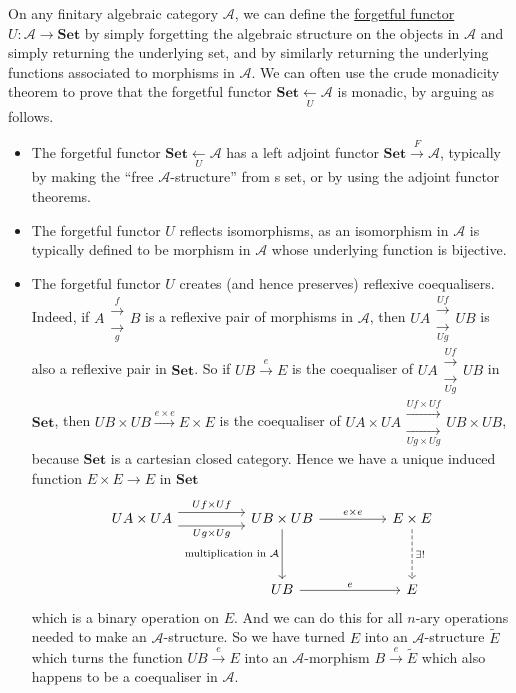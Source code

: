 \documentclass[a4paper,11pt]{article}
\theoremstyle{break_italics}
\theoremstyle{break_upright}
\theoremstyle{remark}
\newcommand{\Set}{\mathbf{Set}}
\begin{document}
On any finitary algebraic category $\mathcal A$, we can define the \uline{forgetful functor} $U \colon \mathcal A \to \Set$ by simply forgetting the algebraic structure on the objects in $\mathcal A$ and simply returning the underlying set, and by similarly returning the underlying functions associated to morphisms in $\mathcal A$. We can often use the crude monadicity theorem to prove that the forgetful functor $\Set \xleftarrow[U]{} \mathcal A$ is monadic, by arguing as follows.
\begin{itemize}
	\item The forgetful functor $\Set \xleftarrow[U]{} \mathcal A$ has a left adjoint functor $\Set \xrightarrow{F} \mathcal A$, typically by making the ``free $\mathcal A$-structure'' from s set, or by using the adjoint functor theorems.
	\item The forgetful functor $U$ reflects isomorphisms, as an isomorphism in $\mathcal A$ is typically defined to be morphism in $\mathcal A$ whose underlying function is bijective.
	\item The forgetful functor $U$ creates (and hence preserves) reflexive coequalisers. Indeed, if $A \substack{\xrightarrow{f} \\ \xrightarrow[g]{}} B$ is a reflexive pair of morphisms in $\mathcal A$, then $UA \substack{\xrightarrow{Uf} \\ \xrightarrow[Ug]{}} UB$ is also a reflexive pair in $\Set$. So if $UB \xrightarrow{e} E$ is the coequaliser of $UA \substack{\xrightarrow{Uf} \\ \xrightarrow[Ug]{}} UB$ in $\Set$, then $UB \times UB \xrightarrow{e \times e} E \times E$ is the coequaliser of $UA \times UA \substack{\xrightarrow{Uf \times Uf} \\ \xrightarrow[Ug \times Ug]{}} UB \times UB$, because $\Set$ is a cartesian closed category. Hence we have a unique induced function $E \times E \to E$ in $\Set$
		\[
\begin{tikzcd}
UA \times UA \arrow[rr, "Uf \times Uf", shift left=2] \arrow[rr, "Ug \times Ug"', shift right=2] &  & UB \times UB \arrow[rr, "e \times e"] \arrow[dd, "\text{multiplication in } \mathcal A"'] &  & E \times E \arrow[dd, "\exists !", dashed] \\ &  &&  & \\
 &  & UB \arrow[rr, "e"] &  & E                                         
\end{tikzcd}
		\]
		which is a binary operation on $E$. And we can do this for all $n$-ary operations needed to make an $\mathcal A$-structure. So we have turned $E$ into an $\mathcal A$-structure $\tilde E$ which turns the function $UB \xrightarrow{e} E$ into an $\mathcal A$-morphism $B \xrightarrow{e} \tilde E$ which also happens to be a coequaliser in $\mathcal A$.
\end{itemize}
\end{document}

